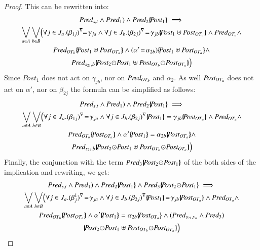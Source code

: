 \documentclass{elsarticle}
\newcommand{\shortodot}{\!\odot\!}
\begin{document}
\begin{proof}
This can be rewritten into:
\begin{multline*}\Pred_{s,t} \land \Pred_1)\wedge\Pred_2\subst{\Post_1} \implies\\
{\bigvee_{a\in A}}\, {\bigvee_{b\in B}} 
\Big(\forall j\in J_a. \vis{\beta_{1j}}\!\!=\!\gamma_{ja} \land  \forall j \in J_{b}. \vis{\beta_{2j}}\!=\!\gamma_{jb}\subst{\Post_1\uplus\Post_{OT_a}}   \land\Pred_{OT_a} \land \\ \Pred_{OT_{b}} \subst{\Post_1\uplus\Post_{OT_a}} \land  (\alpha'\!=\!\alpha_{2 b}) \subst{\Post_1\uplus\Post_{OT_a}} \land \\ \Pred_{s_{21},b}\subst{\Post_2\shortodot\Post_1\uplus \Post_{OT_{b}}\shortodot \Post_{OT_a}}\Big)
\end{multline*}
Since $Post_1$  does not act on $\gamma_{jb}$, nor on $ \Pred_{OT_{b}}$ and $  \alpha_{2}$. As well $\Post_{OT_a}$  does not act on $\alpha'$, nor on  $\beta_{2j}$ the formula can be simplified as follows:
\begin{multline*}\Pred_{s,t} \land \Pred_1)\wedge\Pred_2\subst{\Post_1}\implies\\
\displaystyle{\bigvee_{a\in A}}\, \displaystyle{\bigvee_{b\in B}} 
\Big(\forall j\in J_a. \vis{\beta_{1j}}\!=\!\gamma_{ja} \land  \forall j \in J_{b}. \vis{\beta_{2j}}\subst{\Post_1}=\gamma_{jb} \subst{\Post_{OT_a}}  \land\Pred_{OT_a} \land \\ \Pred_{OT_{b}} \subst{\Post_{OT_a}} \land \alpha'\subst{\Post_1}=\alpha_{2 b} \subst{\Post_{OT_a}} \land\\ \Pred_{s_{21},b}\subst{\Post_2\shortodot\Post_1\uplus \Post_{OT_{b}}\shortodot \Post_{OT_a}}\Big)\end{multline*}
Finally, the conjunction with the term $\Pred_3\subst{\Post_2\shortodot\Post_1}$ of the both sides of the implication and rewriting, we get:
\begin{multline*}\Pred_{s,t} \land \Pred_1)\wedge\Pred_2\subst{\Post_1} \land \Pred_3\subst{\Post_2\shortodot\Post_1}\implies \\
\displaystyle{\bigvee_{a\in A}}\, \displaystyle{\bigvee_{b\in B}} 
\Big(\forall j\in J_a.\vis{\beta^1_j}\!=\!\gamma_{ja} \land  \forall j \in J_{b}. \vis{\beta_{2j}}\subst{\Post_1}\!=\!\gamma_{jb} \subst{\Post_{OT_a}}\land \Pred_{OT_a}\land\\\Pred_{OT_{b}}\subst{\Post_{OT_a}} \land  \alpha'\subst{\Post_1}= \alpha_{2 b} \subst{\Post_{OT_a}} \land (\Pred_{s_{21},v_b} \land  \Pred_3)\\ \subst{\Post_2\shortodot \Post_1\uplus \Post_{OT_{b}}\shortodot\Post_{OT_a}}\Big)\end{multline*} 

\end{proof}
\end{document}
